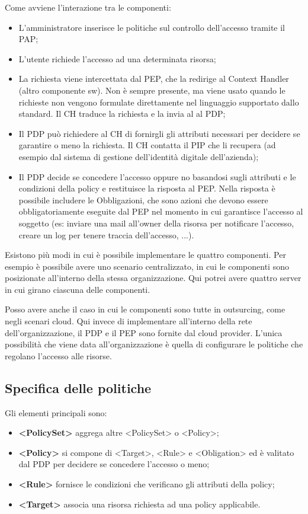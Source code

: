 \noindent Come avviene l'interazione tra le componenti:
\begin{itemize}
    \item L'amministratore inserisce le politiche sul controllo dell'accesso tramite il PAP;
    \item L'utente richiede l'accesso ad una determinata risorsa;
    \item La richiesta viene intercettata dal PEP, che la redirige al Context Handler (altro componente sw). Non è sempre presente, ma viene usato quando le richieste non vengono formulate direttamente nel linguaggio supportato dallo standard. Il CH traduce la richiesta e la invia al al PDP;
    \item Il PDP può richiedere al CH di fornirgli gli attributi necessari per decidere se garantire o meno la richiesta. Il CH contatta il PIP che li recupera (ad esempio dal sistema di gestione dell'identità digitale dell'azienda);
    \item Il PDP decide se concedere l'accesso oppure no basandosi sugli attributi e le condizioni della policy e restituisce la risposta al PEP. Nella risposta è possibile includere le Obbligazioni, che sono azioni che devono essere obbligatoriamente eseguite dal PEP nel momento in cui garantisce l'accesso al soggetto (es: inviare una mail all'owner della risorsa per notificare l'accesso, creare un log per tenere traccia dell'accesso, ...).
\end{itemize}

\noindent Esistono più modi in cui è possibile implementare le quattro componenti. Per esempio è possibile avere uno scenario centralizzato, in cui le componenti sono posizionate all'interno della stessa organizzazione. Qui potrei avere quattro server in cui girano ciascuna delle componenti.

Posso avere anche il caso in cui le componenti sono tutte in outsurcing, come negli scenari cloud. Qui invece di implementare all'interno della rete dell'organizzazione, il PDP e il PEP sono fornite dal cloud provider. L'unica possibilità che viene data all'organizzazione è quella di configurare le politiche che regolano l'accesso alle risorse.

\subsection{Specifica delle politiche}
Gli elementi principali sono:
\begin{itemize}
    \item \textbf{<PolicySet>} aggrega altre <PolicySet> o <Policy>;
    \item \textbf{<Policy>} si compone di <Target>, <Rule> e <Obligation> ed è valitato dal PDP per decidere se concedere l'accesso o meno;
    \item \textbf{<Rule>} fornisce le condizioni che verificano gli attributi della policy;
    \item \textbf{<Target>} associa una risorsa richiesta ad una policy applicabile.
\end{itemize}

